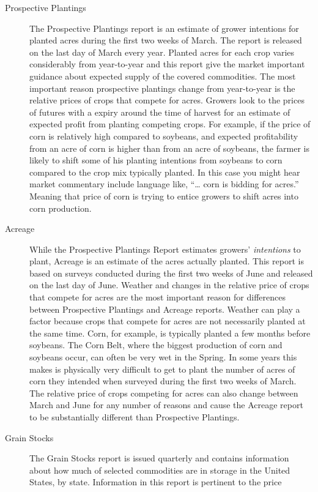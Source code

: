 \documentclass[]{book}
\theoremstyle{definition}
\theoremstyle{definition}
\theoremstyle{remark}
\begin{document}
\begin{description}
\item[Prospective Plantings]
The Prospective Plantings report is an estimate of grower intentions for
planted acres during the first two weeks of March. The report is
released on the last day of March every year. Planted acres for each
crop varies considerably from year-to-year and this report give the
market important guidance about expected supply of the covered
commodities. The most important reason prospective plantings change from
year-to-year is the relative prices of crops that compete for acres.
Growers look to the prices of futures with a expiry around the time of
harvest for an estimate of expected profit from planting competing
crops. For example, if the price of corn is relatively high compared to
soybeans, and expected profitability from an acre of corn is higher than
from an acre of soybeans, the farmer is likely to shift some of his
planting intentions from soybeans to corn compared to the crop mix
typically planted. In this case you might hear market commentary include
language like, ``\ldots{} corn is bidding for acres.'' Meaning that
price of corn is trying to entice growers to shift acres into corn
production.
\item[Acreage]
While the Prospective Plantings Report estimates growers'
\emph{intentions} to plant, Acreage is an estimate of the acres actually
planted. This report is based on surveys conducted during the first two
weeks of June and released on the last day of June. Weather and changes
in the relative price of crops that compete for acres are the most
important reason for differences between Prospective Plantings and
Acreage reports. Weather can play a factor because crops that compete
for acres are not necessarily planted at the same time. Corn, for
example, is typically planted a few months before soybeans. The Corn
Belt, where the biggest production of corn and soybeans occur, can often
be very wet in the Spring. In some years this makes is physically very
difficult to get to plant the number of acres of corn they intended when
surveyed during the first two weeks of March. The relative price of
crops competing for acres can also change between March and June for any
number of reasons and cause the Acreage report to be substantially
different than Prospective Plantings.
\item[Grain Stocks]
The Grain Stocks report is issued quarterly and contains information
about how much of selected commodities are in storage in the United
States, by state. Information in this report is pertinent to the price

\end{description}
\end{document}
